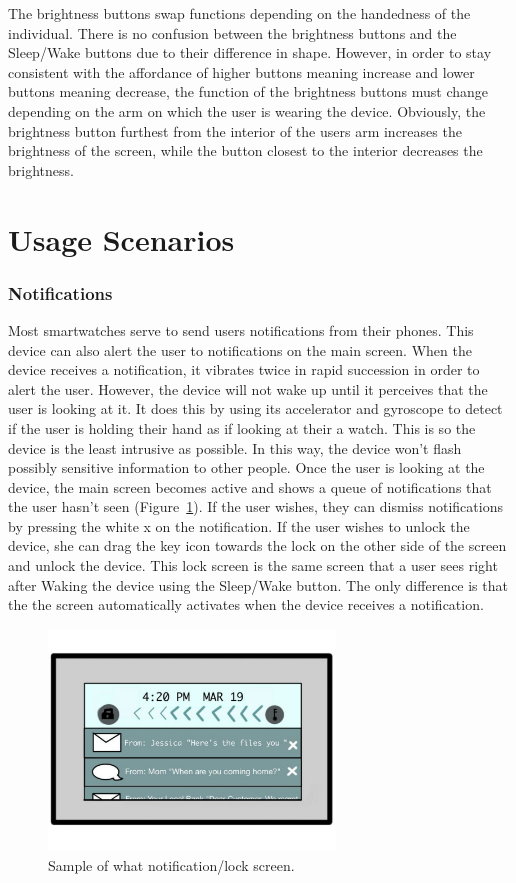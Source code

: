 \documentclass[11pt]{article}
\begin{document}
The brightness buttons swap functions depending on the handedness of the individual. There is no confusion between the brightness buttons and the Sleep/Wake buttons due to their difference in shape. However, in order to stay consistent with the affordance of higher buttons meaning increase and lower buttons meaning decrease, the function of the brightness buttons must change depending on the arm on which the user is wearing the device. Obviously, the brightness button furthest from the interior of the users arm increases the brightness of the screen, while the button closest to the interior decreases the brightness.

\section{Usage Scenarios}
\subsubsection{Notifications}
Most smartwatches serve to send users notifications from their phones. This device can also alert the user to notifications on the main screen. When the device receives a notification, it vibrates twice in rapid succession in order to alert the user. However, the device will not wake up until it perceives that the user is looking at it. It does this by using its accelerator and gyroscope to detect if the user is holding their hand as if looking at their a watch. This is so the device is the least intrusive as possible. In this way, the device won't flash possibly sensitive information to other people. Once the user is looking at the device, the main screen becomes active and shows a queue of notifications that the user hasn't seen (Figure~\ref{fig:notifications}). If the user wishes, they can dismiss notifications by pressing the white x on the notification. If the user wishes to unlock the device, she can drag the key icon towards the lock on the other side of the screen and unlock the device. This lock screen is the same screen that a user sees right after Waking the device using the Sleep/Wake button. The only difference is that the the screen automatically activates when the device receives a notification. 

\begin{figure}[H] %
   \centering
   \includegraphics[width=3in]{notifications.pdf}   
   \caption{Sample of what notification/lock screen.}
   \label{fig:notifications}   
\end{figure}
\end{document}
